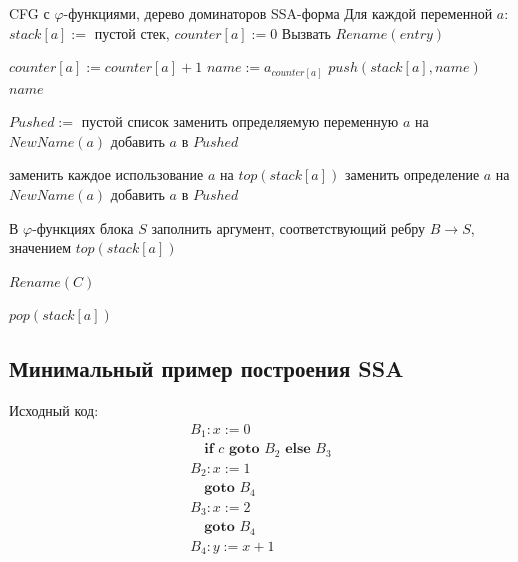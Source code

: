 \documentclass[12pt,a4paper]{article}
\begin{document}
\begin{algorithm}[H]
\caption{Переименование переменных в SSA}
\begin{algorithmic}[1]
\Require CFG с $\varphi$-функциями, дерево доминаторов
\Ensure SSA-форма
\State Для каждой переменной $a$: $stack[a]:=$ пустой стек, $counter[a]:=0$
\State Вызвать $Rename(entry)$

    \State $counter[a]:=counter[a]+1$
    \State $name:=a_{counter[a]}$
    \State $push(stack[a],name)$
    \State \Return $name$
\EndProcedure

    \State $Pushed :=$ пустой список
        \State заменить определяемую переменную $a$ на $NewName(a)$
        \State добавить $a$ в $Pushed$
    \EndFor

        \State заменить каждое использование $a$ на $top(stack[a])$
            \State заменить определение $a$ на $NewName(a)$
            \State добавить $a$ в $Pushed$
        \EndIf
    \EndFor

        \State В $\varphi$-функциях блока $S$ заполнить аргумент, соответствующий ребру $B\to S$, значением $top(stack[a])$
    \EndFor

        \State $Rename(C)$
    \EndFor

        \State $pop(stack[a])$
    \EndFor
\EndProcedure
\end{algorithmic}
\end{algorithm}

\subsection{Минимальный пример построения SSA}

Исходный код:
\[
\begin{array}{l}
B_1: x:=0\\
\quad \textbf{if } c \textbf{ goto } B_2 \textbf{ else } B_3\\[2mm]
B_2: x:=1\\
\quad \textbf{goto } B_4\\[2mm]
B_3: x:=2\\
\quad \textbf{goto } B_4\\[2mm]
B_4: y:=x+1
\end{array}
\]
\end{document}
